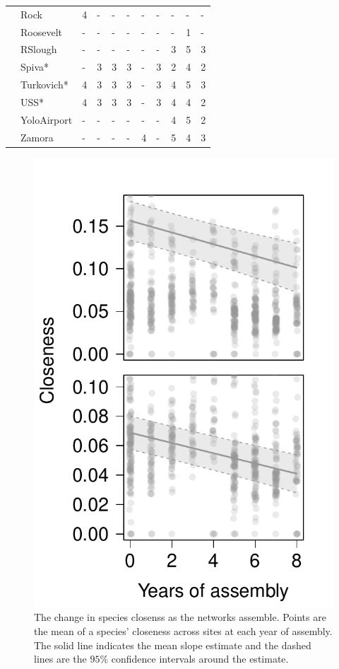 \documentclass[12pt]{article}
\begin{document}
\begin{table}
\begin{tabular}{lllllllllll}
    &Rock & 4 & - & - & - & - & - & - & - & -\\
    &Roosevelt & - & - & - & - & - & - & - & 1 & -\\
    &RSlough & - & - & - & - & - & - & 3 & 5 & 3\\
    &Spiva* & - & 3 & 3 & 3 & - & 3 & 2 & 4 & 2\\
    &Turkovich* & 4 & 3 & 3 & 3 & - & 3 & 4 & 5 & 3\\
    &USS* & 4 & 3 & 3 & 3 & - & 3 & 4 & 4 & 2\\
    &YoloAirport & - & - & - & - & - & - & 4 & 5 & 2\\
    &Zamora & - & - & - & - & 4 & - & 5 & 4 & 3\\
    \hline
  \end{tabular}
  \label{tab:controls}
\end{table}
\clearpage

\begin{figure}
  \centering
  \includegraphics[width=.5\textwidth]{../analysis/speciesLevel/figures/closenessPanel.pdf}
  \caption{The change in species closenss as the networks assemble.
    Points are the mean of a species' closeness across sites at each
    year of assembly. The solid line indicates the mean slope estimate
    and the dashed lines are the $95\%$ confidence intervals around
    the estimate.}
  \label{fig:closeness}
\end{figure}
\clearpage
\end{document}
